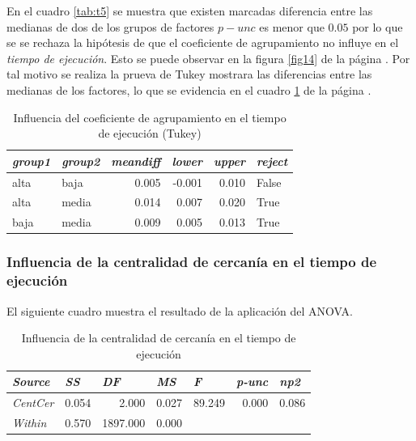 \documentclass{article}
\begin{document}
En el cuadro \ref{tab:t5} se muestra que existen marcadas diferencia entre las medianas de dos de los grupos de factores \textbf{$p-unc$} es menor que $0.05$ por lo que se se rechaza la hipótesis de que el coeficiente de agrupamiento no influye en el \textit{tiempo de ejecución}. Esto se puede observar en la figura \ref{fig14} de la página \pageref{fig14}. Por tal motivo se realiza la prueva de Tukey mostrara las diferencias entre las medianas de los factores, lo que se evidencia en el cuadro \ref{tab:t6} de la página \pageref{tab:t6}.

\begin{table}[htbp]
  \centering
  \caption{Influencia del coeficiente de agrupamiento en el tiempo de ejecución (Tukey)}
    \begin{tabular}{llrrrl}
    \toprule
    \textit{\textbf{group1}} & \textit{\textbf{group2}} & \multicolumn{1}{l}{\textit{\textbf{meandiff}}} & \multicolumn{1}{l}{\textit{\textbf{lower}}} & \multicolumn{1}{l}{\textit{\textbf{upper}}} & \textit{\textbf{reject}} \\
    \midrule
    alta  & baja  & 0.005 & -0.001 & 0.010 & False \\
    alta  & media & 0.014 & 0.007 & 0.020 & True \\
    baja  & media & 0.009 & 0.005 & 0.013 & True \\
    \bottomrule
    \end{tabular}%
  \label{tab:t6}%
\end{table}%


\subsubsection{Influencia de la centralidad de cercanía en el tiempo de ejecución}

El siguiente cuadro muestra el resultado de la aplicación del ANOVA.

\begin{table}[htbp]
  \centering
  \caption{Influencia de la centralidad de cercanía en el tiempo de ejecución}
    \begin{tabular}{lrrrrrr}
    \toprule
    \textit{\textbf{Source}} & \multicolumn{1}{l}{\textit{\textbf{SS}}} & \multicolumn{1}{l}{\textit{\textbf{DF}}} & \multicolumn{1}{l}{\textit{\textbf{MS}}} & \multicolumn{1}{l}{\textit{\textbf{F}}} & \multicolumn{1}{l}{\textit{\textbf{p-unc}}} & \multicolumn{1}{l}{\textit{\textbf{np2}}} \\
    \midrule
    \textit{CentCer} & 0.054 & 2.000 & 0.027 & 89.249 & 0.000 & 0.086 \\
    \textit{Within} & 0.570 & 1897.000 & 0.000 &       &       &  \\
    \bottomrule
    \end{tabular}%
  \label{tab:t7}%
\end{table}%
\end{document}
